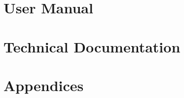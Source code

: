 \documentclass[12pt, letterpaper, fleqn]{report}
\begin{document}


\listoffigures

\tableofcontents

\part{User Manual}


\part{Technical Documentation}


\part{Appendices}

\appendix



\end{document}
